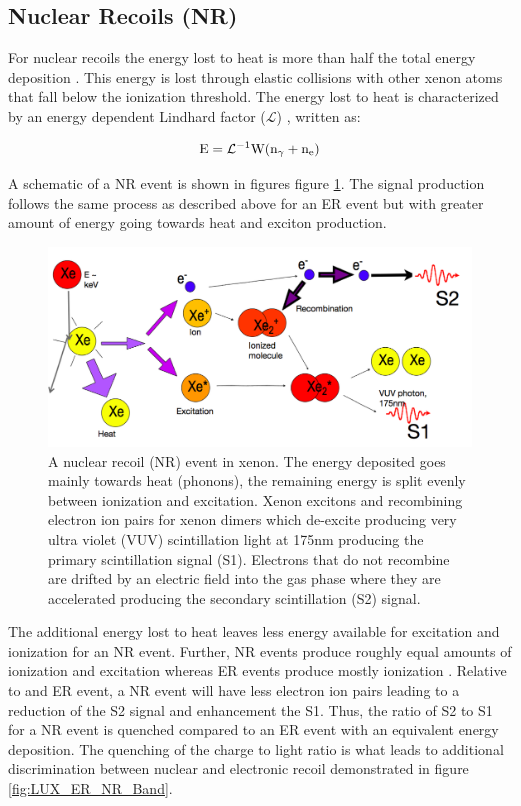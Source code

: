 \subsection{Nuclear Recoils (NR)}
For nuclear recoils the energy lost to heat is more than half the total energy deposition \cite{FanoTheoretical}. This energy is lost through elastic collisions with other xenon atoms that fall below the ionization threshold. The energy lost to heat is characterized by an energy dependent Lindhard factor ($\mathcal{L}$) \cite{Lindhard}, written as: 

\begin{equation}
\rm E=\mathcal{L}^{-1}W (n_\gamma + n_e)
\label{eq:Lindhard}
\end{equation}

A schematic of a NR event is shown in figures figure \ref{fig:TomS_NR}. The signal production follows the same process as described above for an ER event but with greater amount of energy going towards heat and exciton production. 

\renewcommand{\baselinestretch}{1}
\small\normalsize
 \begin{figure}[h!]\centering
\includegraphics[width=130mm]{Chapter_LUX_Det/NR_T_Shutt.png}
\caption{A nuclear recoil (NR) event in xenon. The energy deposited goes mainly towards heat (phonons), the remaining energy is split evenly between ionization and excitation. Xenon excitons and recombining electron ion pairs for xenon dimers which de-excite producing very ultra violet  (VUV) scintillation light at 175nm producing the primary scintillation signal (S1). Electrons that do not recombine are drifted by an electric field into the gas phase where they are accelerated producing the secondary scintillation (S2) signal. }
\label{fig:TomS_NR}
\end{figure}
\renewcommand{\baselinestretch}{2}
\small\normalsize

\noindent The additional energy lost to heat leaves less energy available for excitation and ionization for an NR event. Further, NR events produce roughly equal amounts of ionization and excitation whereas ER events produce mostly ionization \cite{FanoTheoretical}  \cite{Dahl_Thesis}. Relative to and ER event, a NR event will have less electron ion pairs leading to a reduction of the S2 signal and enhancement the S1. Thus, the ratio of S2 to S1 for a NR event is quenched compared to an ER event with an equivalent energy deposition. The quenching of the charge to light ratio is what leads to additional discrimination between nuclear and electronic recoil demonstrated in figure \ref{fig:LUX_ER_NR_Band}.

